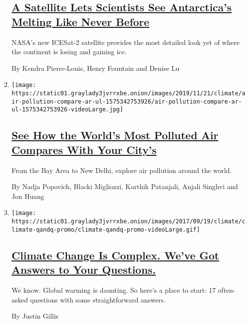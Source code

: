 \begin{enumerate}
{  \subsection{\texorpdfstring{\href{/interactive/2020/04/30/climate/antarctica-ice-climate-change.html}{A
  Satellite Lets Scientists See Antarctica's Melting Like Never
  Before}}{A Satellite Lets Scientists See Antarctica's Melting Like Never Before}}\label{a-satellite-lets-scientists-see-antarcticas-melting-like-never-before}}

  NASA's new ICESat-2 satellite provides the most detailed look yet of
  where the continent is losing and gaining ice.

  By Kendra Pierre-Louis, Henry Fountain and Denise Lu
\item
  \texttt{[image: https://static01.graylady3jvrrxbe.onion/images/2019/11/21/climate/air-pollution-compare-ar-ul-1575342753926/air-pollution-compare-ar-ul-1575342753926-videoLarge.jpg]}

  \hypertarget{see-how-the-worlds-most-polluted-air-compares-with-your-citys}{%
  \subsection{\texorpdfstring{\href{/interactive/2019/12/02/climate/air-pollution-compare-ar-ul.html}{See
  How the World's Most Polluted Air Compares With Your
  City's}}{See How the World's Most Polluted Air Compares With Your City's}}\label{see-how-the-worlds-most-polluted-air-compares-with-your-citys}}

  From the Bay Area to New Delhi, explore air pollution around the
  world.

  By Nadja Popovich, Blacki Migliozzi, Karthik Patanjali, Anjali Singhvi
  and Jon Huang
\item
  \texttt{[image: https://static01.graylady3jvrrxbe.onion/images/2017/09/19/climate/climate-qandq-promo/climate-qandq-promo-videoLarge.gif]}

  \hypertarget{climate-change-is-complex-weve-got-answers-to-your-questions}{%
  \subsection{\texorpdfstring{\href{/interactive/2017/climate/what-is-climate-change.html}{Climate
  Change Is Complex. We've Got Answers to Your
  Questions.}}{Climate Change Is Complex. We've Got Answers to Your Questions.}}\label{climate-change-is-complex-weve-got-answers-to-your-questions}}

  We know. Global warming is daunting. So here's a place to start: 17
  often-asked questions with some straightforward answers.

  By Justin Gillis
\end{enumerate}


